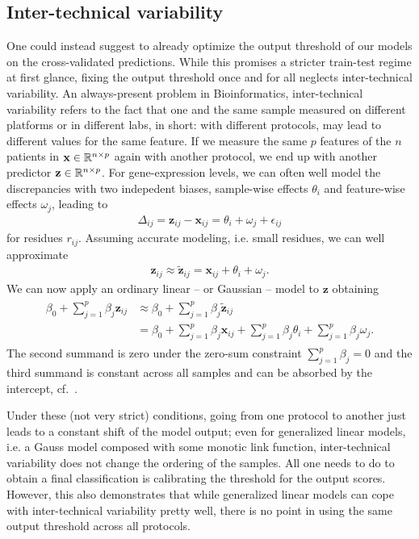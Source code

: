 \subsection{Inter-technical variability} 
One could instead suggest to already optimize the output threshold of our models on the cross-validated 
predictions. While this promises a stricter train-test regime at first glance, fixing the output 
threshold once and for all neglects inter-technical variability. An always-present problem in 
Bioinformatics, inter-technical variability refers to the fact that one and the same sample 
measured on different platforms or in different labs, in short: with different protocols, may 
lead to different values for the same feature. If we measure the same $p$ features of the $n$ 
patients in $\mathbf{x} \in \mathbb{R}^{n \times p}$ again with another protocol, we end up with another predictor 
$\mathbf{z} \in \mathbb{R}^{n \times p}$.
For gene-expression levels,
we can often well model the discrepancies with two indepedent biases, sample-wise effects $\theta_i$
and feature-wise effects $\omega_j$, leading to
\begin{align}
    \Delta_{ij} = \mathbf{z}_{ij} - \mathbf{x}_{ij} = \theta_i + \omega_j + \epsilon_{ij}
\end{align}
for residues $r_{ij}$. Assuming accurate modeling, i.e. small residues, we can well approximate
\begin{align}
    \mathbf{z}_{ij} \approx \tilde{\mathbf{z}}_{ij} = \mathbf{x}_{ij} + \theta_i + \omega_j.
\end{align}
We can now apply an ordinary linear -- or Gaussian -- model to $\mathbf{z}$ obtaining
\begin{align} \label{eq:inter-tech}
\begin{split}
    \beta_0 + \sum_{j=1}^p \beta_j \mathbf{z}_{ij} &\approx \beta_0 + \sum_{j=1}^p \beta_j \tilde{\mathbf{z}}_{ij} \\
    &= \beta_0 + \sum_{j=1}^p \beta_j \mathbf{x}_{ij} + \sum_{j=1}^p \beta_j \theta_i + \sum_{j=1}^p \beta_j \omega_j.
\end{split}
\end{align}
The second summand is zero under the zero-sum constraint $\sum_{j = 1}^p \beta_j = 0$ and the third 
summand is constant across all samples and can be absorbed by the intercept, cf.\ 
\cite{transplatform17}. 

Under these (not very 
strict) conditions, going from one protocol to another just leads to a constant shift of the model 
output; even for generalized linear models, i.e. a Gauss model composed with some monotic link function,
inter-technical variability does not change the ordering of the samples. All one needs to do to 
obtain a final classification is calibrating the threshold for the output scores. However, this 
also demonstrates that while generalized linear models can cope with inter-technical variability 
pretty well, there is no point in using the same output threshold across all protocols.

